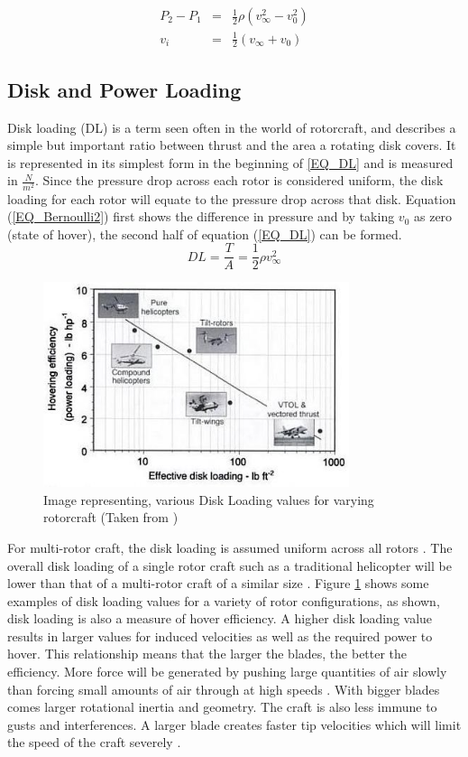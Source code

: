 \documentclass[a4paper, 10pt, conference]{ieeeconf}
\begin{document}
\begin{eqnarray}
P_2 - P_1 &=& \frac{1}{2} \rho (v_\infty^2 - v_0^2)\label{EQ_Bernoulli2}\\
v_i &=& \frac{1}{2} (v_\infty + v_0)\label{EQ_RotorVelocity}
\end{eqnarray}


\subsection{Disk and Power Loading}
Disk loading (DL) is a term seen often in the world of rotorcraft, and describes a simple but important ratio between thrust and the area a rotating disk covers. It is represented in its simplest form in the beginning of \eqref{EQ_DL} and is measured in $\frac{N}{m^{2}}$. Since the pressure drop across each rotor is considered uniform, the disk loading for each rotor will equate to the pressure drop across that disk. Equation (\ref{EQ_Bernoulli2}) first shows the difference in pressure and by taking $v_0$ as zero (state of hover), the second half of equation (\ref{EQ_DL}) can be formed. 
\begin{equation}
\label{EQ_DL}
DL = \frac{T}{A} = \frac{1}{2} \rho v_\infty^2
\end{equation}

\begin{figure}[b]
\centering
\includegraphics[height = 6cm]{Images/Literature/DL}     
\caption{Image representing, various Disk Loading values for varying rotorcraft (Taken from \cite{Leishman})}
\label{IM_DL}
\end{figure}

For multi-rotor craft, the disk loading is assumed uniform across all rotors \cite{Leishman}. The overall disk loading of a single rotor craft such as a traditional helicopter will be lower than that of a multi-rotor craft of a similar size \cite{RotorCraftHand}. Figure \ref{IM_DL} shows some examples of disk loading values for a variety of rotor configurations, as shown, disk loading is also a measure of hover efficiency.
A higher disk loading value results in larger values for induced velocities as well as the required power to hover. This relationship means that the larger the blades, the better the efficiency. More force will be generated by pushing large quantities of air slowly than forcing small amounts of air through at high speeds \cite{TheoryofFlight}. With bigger blades comes larger rotational inertia and geometry. The craft is also less immune to gusts and interferences. A larger blade creates faster tip velocities which will limit the speed of the craft severely \cite{Leishman}.
\end{document}
